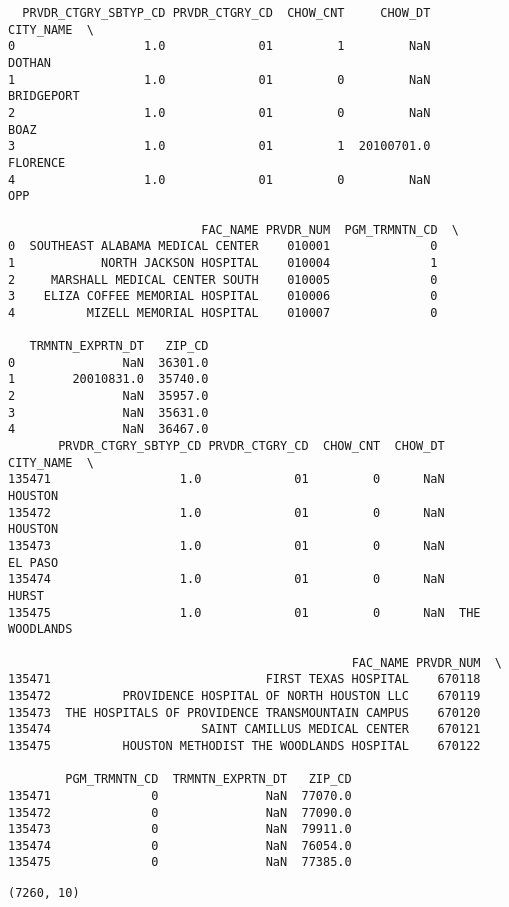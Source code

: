 \documentclass[
  letterpaper,
  DIV=11,
  numbers=noendperiod]{scrartcl}
\begin{document}
\begin{verbatim}
  PRVDR_CTGRY_SBTYP_CD PRVDR_CTGRY_CD  CHOW_CNT     CHOW_DT   CITY_NAME  \
0                  1.0             01         1         NaN      DOTHAN   
1                  1.0             01         0         NaN  BRIDGEPORT   
2                  1.0             01         0         NaN        BOAZ   
3                  1.0             01         1  20100701.0    FLORENCE   
4                  1.0             01         0         NaN         OPP   

                           FAC_NAME PRVDR_NUM  PGM_TRMNTN_CD  \
0  SOUTHEAST ALABAMA MEDICAL CENTER    010001              0   
1            NORTH JACKSON HOSPITAL    010004              1   
2     MARSHALL MEDICAL CENTER SOUTH    010005              0   
3    ELIZA COFFEE MEMORIAL HOSPITAL    010006              0   
4          MIZELL MEMORIAL HOSPITAL    010007              0   

   TRMNTN_EXPRTN_DT   ZIP_CD  
0               NaN  36301.0  
1        20010831.0  35740.0  
2               NaN  35957.0  
3               NaN  35631.0  
4               NaN  36467.0  
       PRVDR_CTGRY_SBTYP_CD PRVDR_CTGRY_CD  CHOW_CNT  CHOW_DT      CITY_NAME  \
135471                  1.0             01         0      NaN        HOUSTON   
135472                  1.0             01         0      NaN        HOUSTON   
135473                  1.0             01         0      NaN        EL PASO   
135474                  1.0             01         0      NaN          HURST   
135475                  1.0             01         0      NaN  THE WOODLANDS   

                                                FAC_NAME PRVDR_NUM  \
135471                              FIRST TEXAS HOSPITAL    670118   
135472          PROVIDENCE HOSPITAL OF NORTH HOUSTON LLC    670119   
135473  THE HOSPITALS OF PROVIDENCE TRANSMOUNTAIN CAMPUS    670120   
135474                     SAINT CAMILLUS MEDICAL CENTER    670121   
135475          HOUSTON METHODIST THE WOODLANDS HOSPITAL    670122   

        PGM_TRMNTN_CD  TRMNTN_EXPRTN_DT   ZIP_CD  
135471              0               NaN  77070.0  
135472              0               NaN  77090.0  
135473              0               NaN  79911.0  
135474              0               NaN  76054.0  
135475              0               NaN  77385.0  
\end{verbatim}

\begin{verbatim}
(7260, 10)
\end{verbatim}
\end{document}

